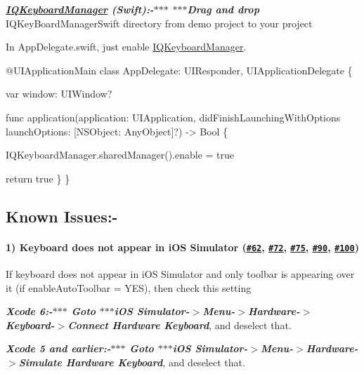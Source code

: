 {\itshape {\bfseries \mbox{\hyperlink{interface_i_q_keyboard_manager}{I\+Q\+Keyboard\+Manager}} (Swift)\+:-\/$\ast$$\ast$$\ast$ $\ast$$\ast$$\ast$\+Drag and drop}} {\ttfamily I\+Q\+Key\+Board\+Manager\+Swift} directory from demo project to your project

In App\+Delegate.\+swift, just enable \mbox{\hyperlink{interface_i_q_keyboard_manager}{I\+Q\+Keyboard\+Manager}}.


\begin{DoxyCode}
@UIApplicationMain
class AppDelegate: UIResponder, UIApplicationDelegate \{

    var window: UIWindow?

    func application(application: UIApplication, didFinishLaunchingWithOptions launchOptions: [NSObject:
       AnyObject]?) -> Bool \{

    IQKeyboardManager.sharedManager().enable = true

    return true
    \}
\}
\end{DoxyCode}


\subsection*{Known Issues\+:-\/}



\paragraph*{1) Keyboard does not appear in i\+OS Simulator (\href{https://github.com/hackiftekhar/IQKeyboardManager/issues/62}{\tt \#62}, \href{https://github.com/hackiftekhar/IQKeyboardManager/issues/72}{\tt \#72}, \href{https://github.com/hackiftekhar/IQKeyboardManager/issues/75}{\tt \#75}, \href{https://github.com/hackiftekhar/IQKeyboardManager/issues/90}{\tt \#90}, \href{https://github.com/hackiftekhar/IQKeyboardManager/issues/100}{\tt \#100})}

If keyboard does not appear in i\+OS Simulator and only toolbar is appearing over it (if enable\+Auto\+Toolbar = Y\+ES), then check this setting

{\itshape {\bfseries Xcode 6\+:-\/$\ast$$\ast$$\ast$ Goto $\ast$$\ast$$\ast$i\+OS Simulator-\/$>$Menu-\/$>$Hardware-\/$>$Keyboard-\/$>$Connect Hardware Keyboard}}, and deselect that.

{\itshape {\bfseries Xcode 5 and earlier\+:-\/$\ast$$\ast$$\ast$ Goto $\ast$$\ast$$\ast$i\+OS Simulator-\/$>$Menu-\/$>$Hardware-\/$>$Simulate Hardware Keyboard}}, and deselect that.

